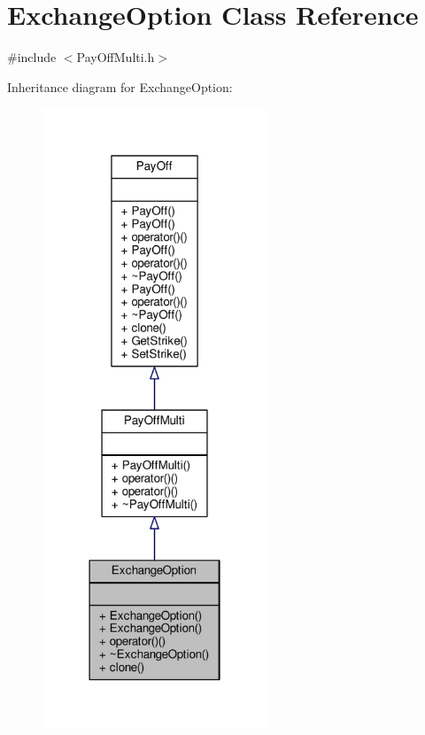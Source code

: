 \hypertarget{classExchangeOption}{}\section{Exchange\+Option Class Reference}
\label{classExchangeOption}


{\ttfamily \#include $<$Pay\+Off\+Multi.\+h$>$}



Inheritance diagram for Exchange\+Option\+:
\nopagebreak
\begin{figure}[H]
\begin{center}
\leavevmode
\includegraphics[width=190pt]{classExchangeOption__inherit__graph}
\end{center}
\end{figure}


